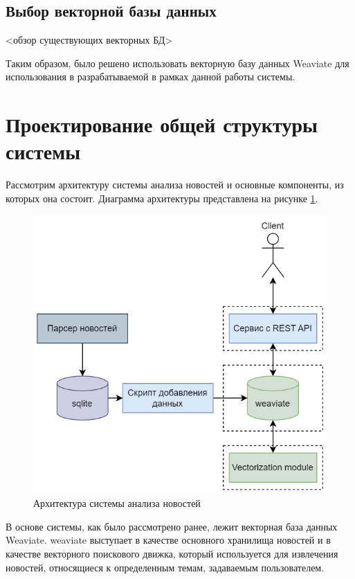 \subsection{Выбор векторной базы данных}

<обзор существующих векторных БД>

Таким образом, было решено использовать векторную базу данных Weaviate для использования в разрабатываемой в рамках данной работы системы.

\section{Проектирование общей структуры системы}

Рассмотрим архитектуру системы анализа новостей и основные компоненты, из которых она состоит. Диаграмма архитектуры представлена на рисунке \ref{img:system-architecture}.

\begin{figure}[h]
    \centering
    \includegraphics{images/system-architecture.png}
    \caption{Архитектура системы анализа новостей}
    \label{img:system-architecture}
\end{figure}

В основе системы, как было рассмотрено ранее, лежит векторная база данных Weaviate. weaviate выступает в качестве основного хранилища новостей и в качестве векторного поискового движка, который используется для извлечения новостей, относящиеся к определенным темам, задаваемым пользователем.

